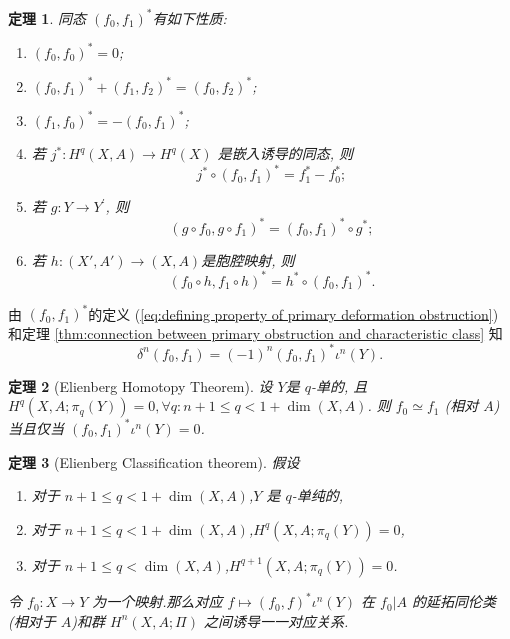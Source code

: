 \documentclass{ctexart}
\theoremstyle{plain}
\newtheorem{theorem}{定理}[section]
\theoremstyle{definition}
\begin{document}
            \begin{theorem}
                \label{thm:properties of operators of obstruction of deforming}
                同态 $(f_0,f_1)^{*}$有如下性质:
                \begin{enumerate}
                    \item $\left(f_0, f_0\right)^*=0$;
                    \item $\left(f_0, f_1\right)^*+\left(f_1, f_2\right)^*=\left(f_0, f_2\right)^*$;
                    \item $\left(f_1, f_0\right)^*=-\left(f_0, f_1\right)^*$;
                    \item 若 $j^*: H^q(X, A) \rightarrow H^q(X)$ 是嵌入诱导的同态, 则
                    $$
                    j^* \circ\left(f_0, f_1\right)^*=f_1^*-f_0^* ;
                    $$
                    \item 若 $g: Y \rightarrow Y^{\prime}$, 则
                    $$
                    \left(g \circ f_0, g \circ f_1\right)^*=\left(f_0, f_1\right)^* \circ g^* ;
                    $$
                    \item 若 $h:(X',A')\to (X,A)$是胞腔映射, 则 
                    $$
                    (f_0\circ h, f_1\circ h)^{*}=h^{*}\circ (f_0,f_1)^{*}.
                    $$
                \end{enumerate}
            \end{theorem}

            由 $(f_0,f_1)^{*}$的定义 (\ref{eq:defining property of primary deformation obstruction}) 和定理 \ref{thm:connection between primary obstruction and characteristic class} 知
            \begin{equation}
              \delta^{n}(f_0,f_1)=(-1)^{n}(f_0,f_1)^{*}\iota^{n}(Y).
            \end{equation}

            \begin{theorem}[Elienberg Homotopy Theorem]
                \label{thm:Elienberg Homotopy Theorem}
                设 $Y$是 $q$-单的, 且 $H^{q}(X,A;\pi_{q}(Y))=0, \forall q:n+1\le q<1+\operatorname{dim}(X,A)$. 则 $f_0\simeq f_1$ (相对 $A$)当且仅当 $(f_0,f_1)^{*}\iota^{n}(Y)=0$.
            \end{theorem}

            \begin{theorem}[Elienberg Classification theorem]
                \label{thm:Elienberg Classification Theorem}
                假设
                \begin{enumerate}
                    \item 对于 $n + 1 \leq q < 1 + \dim(X, A)$,$Y$ 是 $q$-单纯的,
                    \item 对于 $n + 1 \leq q < 1 + \dim(X, A)$,$H^q(X, A; \pi_q(Y)) = 0$,
                    \item 对于 $n + 1 \leq q < \dim(X, A)$,$H^{q+1}(X, A; \pi_q(Y)) = 0$.
                \end{enumerate}
                令 $f_0 : X \to Y$ 为一个映射.那么对应 $f \mapsto (f_0, f)^* \iota^n(Y)$ 在 $f_0 | A$ 的延拓同伦类(相对于 $A$)和群 $H^n(X, A; \Pi)$ 之间诱导一一对应关系.
            \end{theorem}
\end{document}
